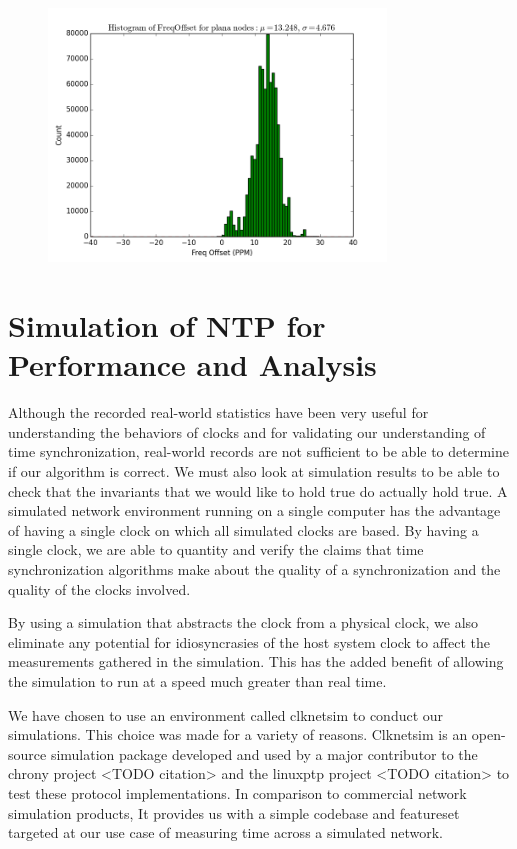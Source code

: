 \begin{figure}[h]
  \centering
  \includegraphics[width=0.8\textwidth]{plana-freq-offset.png}
\end{figure}

\section{Simulation of NTP for Performance and Analysis}

Although the recorded real-world statistics have been very useful for
understanding the behaviors of clocks and for validating our
understanding of time synchronization, real-world records are not
sufficient to be able to determine if our algorithm is correct. We
must also look at simulation results to be able to check that the
invariants that we would like to hold true do actually hold true. A
simulated network environment running on a single computer has the
advantage of having a single clock on which all simulated clocks are
based. By having a single clock, we are able to quantity and verify
the claims that time synchronization algorithms make about the quality
of a synchronization and the quality of the clocks involved.

By using a simulation that abstracts the clock from a physical clock,
we also eliminate any potential for idiosyncrasies of the host system
clock to affect the measurements gathered in the simulation. This has
the added benefit of allowing the simulation to run at a speed much
greater than real time.

We have chosen to use an environment called clknetsim %
to conduct our simulations. This choice was made for a variety of
reasons. Clknetsim is an open-source simulation package developed and
used by a major contributor to the chrony project <TODO citation> and the
linuxptp project <TODO citation> to test these protocol implementations. In
comparison to commercial network simulation products, It provides us
with a simple codebase and featureset targeted at our use case of
measuring time across a simulated network.

